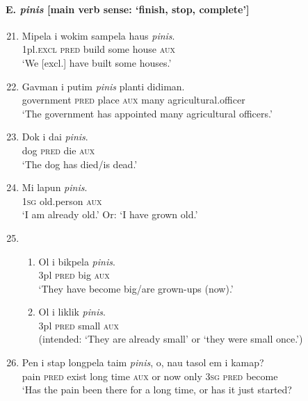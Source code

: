 {\paragraph*{E. \textit{pinis}  [main verb sense: ‘finish, stop, complete’]}
\begin{enumerate} \setcounter{enumi}{20} 
\item 
\gll  Mipela  i  wokim  sampela  haus  \textit{pinis}.\\
1pl.\textsc{excl}  \textsc{pred}  build  some  house  \textsc{aux}\\
\glt ‘We [excl.] have built some houses.’  

\item  
\gll  Gavman  i  putim  \textit{pinis}  planti  didiman.\\
government  \textsc{pred} place  \textsc{aux}  many  agricultural.officer\\
\glt ‘The government has appointed many agricultural officers.’   
\item 
\gll  Dok  i  dai  \textit{pinis}.\\
dog  \textsc{pred}  die  \textsc{aux}\\
\glt ‘The dog has died/is dead.’  

\item
\gll  Mi  lapun  \textit{pinis}.\\
\textsc{1sg}  old.person  \textsc{aux}\\
\glt ‘I am already old.’ Or: ‘I have grown old.’  

\item 
\begin{enumerate}[label=\alph*.]
\item 
\gll Ol  i  bikpela  \textit{pinis}.\\
3pl  \textsc{pred}  big  \textsc{aux}\\
\glt ‘They have become big/are grown-ups (now).’  
\item 
\gll  *Ol  i  liklik  \textit{pinis}.\\
3pl  \textsc{pred}  small  \textsc{aux}\\
\glt (intended: ‘They are already small’ or ‘they were small once.’)
\end{enumerate}

\item 
\gll Pen  i  stap  longpela  taim  \textit{pinis},  o,  nau  tasol  em  i  kamap?\\
pain  \textsc{pred}  exist  long  time  \textsc{aux}  or  now  only  \textsc{3sg}  \textsc{pred}  become\\
\glt ‘Has the pain been there for a long time, or has it just started?  


\end{enumerate}}

